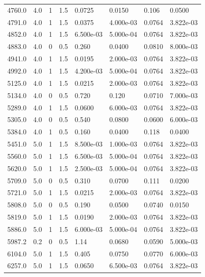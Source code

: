 \documentclass[preview]{standalone}
\begin{document}
{{{\begin{tabular}{L{1.2cm}C{1.2cm} C{0.3cm}C{0.5cm} C{1.4cm}C{1.4cm} C{1.4cm}C{1.4cm}}
  4760.0  &   4.0  & 1     & 1.5 &  0.0725  & 0.0150  & 0.106 &  0.0500   \\ 
  4791.0  &   4.0  & 1     & 1.5 &  0.0375  & 4.000e-03  & 0.0764 &  3.822e-03   \\ 
  4852.0  &   4.0  & 1     & 1.5 &  6.500e-03  & 5.000e-04  & 0.0764 &  3.822e-03   \\ 
  4883.0  &   4.0  & 0     & 0.5 &  0.260  & 0.0400  & 0.0810 &  8.000e-03   \\ 
  4941.0  &   4.0  & 1     & 1.5 &  0.0195  & 2.000e-03  & 0.0764 &  3.822e-03   \\ 
  4992.0  &   4.0  & 1     & 1.5 &  4.200e-03  & 5.000e-04  & 0.0764 &  3.822e-03   \\ 
  5125.0  &   4.0  & 1     & 1.5 &  0.0215  & 2.000e-03  & 0.0764 &  3.822e-03   \\ 
  5134.0  &   4.0  & 0     & 0.5 &  0.720  & 0.120  & 0.0710 &  7.000e-03   \\ 
  5289.0  &   4.0  & 1     & 1.5 &  0.0600  & 6.000e-03  & 0.0764 &  3.822e-03   \\ 
  5305.0  &   4.0  & 0     & 0.5 &  0.540  & 0.0800  & 0.0600 &  6.000e-03   \\ 
  5384.0  &   4.0  & 1     & 0.5 &  0.160  & 0.0400  & 0.118 &  0.0400   \\ 
  5451.0  &   5.0  & 1     & 1.5 &  8.500e-03  & 1.000e-03  & 0.0764 &  3.822e-03   \\ 
  5560.0  &   5.0  & 1     & 1.5 &  6.500e-03  & 5.000e-04  & 0.0764 &  3.822e-03   \\ 
  5620.0  &   5.0  & 1     & 1.5 &  2.500e-03  & 5.000e-04  & 0.0764 &  3.822e-03   \\ 
  5709.0  &   5.0  & 0     & 0.5 &  0.310  & 0.0700  & 0.111 &  0.0200   \\ 
  5721.0  &   5.0  & 1     & 1.5 &  0.0215  & 2.000e-03  & 0.0764 &  3.822e-03   \\ 
  5808.0  &   5.0  & 0     & 0.5 &  0.190  & 0.0500  & 0.0740 &  0.0150   \\ 
  5819.0  &   5.0  & 1     & 1.5 &  0.0190  & 2.000e-03  & 0.0764 &  3.822e-03   \\ 
  5886.0  &   5.0  & 1     & 1.5 &  6.000e-03  & 5.000e-04  & 0.0764 &  3.822e-03   \\ 
  5987.2  &   0.2  & 0     & 0.5 &  1.14  & 0.0680  & 0.0590 &  5.000e-03   \\ 
  6104.0  &   5.0  & 1     & 1.5 &  0.405  & 0.0750  & 0.0770 &  6.000e-03   \\ 
  6257.0  &   5.0  & 1     & 1.5 &  0.0650  & 6.500e-03  & 0.0764 &  3.822e-03   \\ 

\end{tabular}}}}
\end{document}
